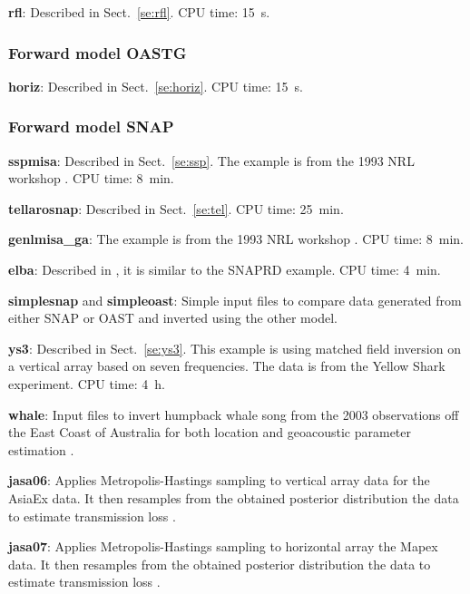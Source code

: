 \documentclass{saclantc}
\begin{document}
\vspace*{-1.0mm}\noindent
{\bf rfl}: Described in Sect.~\ref{se:rfl}. CPU time: 15~s.

\subsubsection{Forward model OASTG}

\vspace*{-1.0mm}\noindent
{\bf horiz}: Described in Sect.~\ref{se:horiz}. CPU time: 15~s.

\subsubsection{Forward model SNAP}

\vspace*{-1.0mm}\noindent
{\bf sspmisa}: Described in Sect.~\ref{se:ssp}. 
The example is from the 1993 NRL
workshop \cite{porter:jca94}. CPU time: 8~min.

\noindent
{\bf tellarosnap}: Described in Sect.~\ref{se:tel}. CPU time: 25~min.
\noindent

{\bf genlmisa\_ga}:  The example is from the 1993 NRL
workshop \cite{porter:jca94}. 
CPU time: 8~min.

\noindent
{\bf elba}: Described in \cite{gingras:asa95}, 
it is similar to the {\sf SNAPRD}
example. CPU time: 4~min.

\noindent
{\bf simplesnap} and {\bf simpleoast}: Simple input files to compare
data generated from either {\sf SNAP} or {\sf OAST} and inverted using the 
other model. 

{\bf ys3}: Described in Sect.\ \ref{se:ys3}.
This example is using matched field inversion on
a vertical array based on seven frequencies. The data is from the Yellow
Shark experiment. CPU time: 4~h.

\noindent
{\bf whale}:  Input files to invert  humpback whale song from the 2003
 observations off the East Coast of Australia for both
location and geoacoustic parameter estimation \cite{thode05}. 


\noindent
{\bf jasa06}: Applies Metropolis-Hastings sampling to vertical array data for the AsiaEx data.   It then resamples from the obtained posterior distribution the data to estimate transmission loss \cite{huang06}.

\noindent
{\bf jasa07}: Applies Metropolis-Hastings sampling to horizontal array the Mapex  data.   It then resamples from the obtained posterior distribution the data to estimate transmission loss \cite{goh07}.
\end{document}
